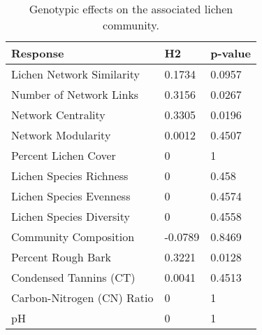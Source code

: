 \begin{table}[ht]
\centering
\begin{tabular}{lll}
  \hline
Response & H2 & p-value \\ 
  \hline
Lichen Network Similarity & 0.1734 & 0.0957 \\ 
  Number of Network Links & 0.3156 & 0.0267 \\ 
  Network Centrality & 0.3305 & 0.0196 \\ 
  Network Modularity & 0.0012 & 0.4507 \\ 
  Percent Lichen Cover & 0 & 1 \\ 
  Lichen Species Richness & 0 & 0.458 \\ 
  Lichen Species Evenness & 0 & 0.4574 \\ 
  Lichen Species Diversity & 0 & 0.4558 \\ 
  Community Composition & -0.0789 & 0.8469 \\ 
  Percent Rough Bark & 0.3221 & 0.0128 \\ 
  Condensed Tannins (CT) & 0.0041 & 0.4513 \\ 
  Carbon-Nitrogen (CN) Ratio & 0 & 1 \\ 
  pH & 0 & 1 \\ 
   \hline
\end{tabular}
\caption{Genotypic effects on the associated lichen community.} 
\label{tab:h2_table}
\end{table}
